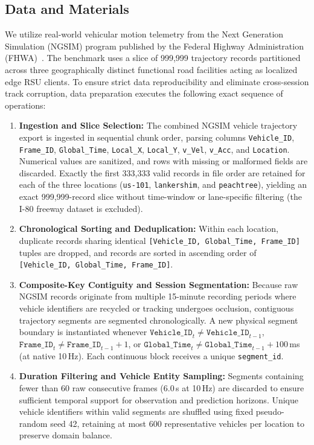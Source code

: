 \documentclass[journal]{IEEEtran}
\begin{document}
\subsection{Data and Materials}
\label{sec:data_materials}
We utilize real-world vehicular motion telemetry from the Next Generation Simulation (NGSIM) program published by the Federal Highway Administration (FHWA)~\cite{fhwa2006ngsim}. The benchmark uses a slice of 999,999 trajectory records partitioned across three geographically distinct functional road facilities acting as localized edge RSU clients. To ensure strict data reproducibility and eliminate cross-session track corruption, data preparation executes the following exact sequence of operations:
\begin{enumerate}
    \item \textbf{Ingestion and Slice Selection:} The combined NGSIM vehicle trajectory export is ingested in sequential chunk order, parsing columns \texttt{Vehicle\_ID}, \texttt{Frame\_ID}, \texttt{Global\_Time}, \texttt{Local\_X}, \texttt{Local\_Y}, \texttt{v\_Vel}, \texttt{v\_Acc}, and \texttt{Location}. Numerical values are sanitized, and rows with missing or malformed fields are discarded. Exactly the first 333,333 valid records in file order are retained for each of the three locations (\texttt{us-101}, \texttt{lankershim}, and \texttt{peachtree}), yielding an exact 999,999-record slice without time-window or lane-specific filtering (the I-80 freeway dataset is excluded).
    \item \textbf{Chronological Sorting and Deduplication:} Within each location, duplicate records sharing identical \texttt{[Vehicle\_ID, Global\_Time, Frame\_ID]} tuples are dropped, and records are sorted in ascending order of \texttt{[Vehicle\_ID, Global\_Time, Frame\_ID]}.
    \item \textbf{Composite-Key Contiguity and Session Segmentation:} Because raw NGSIM records originate from multiple 15-minute recording periods where vehicle identifiers are recycled or tracking undergoes occlusion, contiguous trajectory segments are segmented chronologically. A new physical segment boundary is instantiated whenever $\texttt{Vehicle\_ID}_t \ne \texttt{Vehicle\_ID}_{t-1}$, $\texttt{Frame\_ID}_t \ne \texttt{Frame\_ID}_{t-1} + 1$, or $\texttt{Global\_Time}_t \ne \texttt{Global\_Time}_{t-1} + 100$\,ms (at native 10\,Hz). Each continuous block receives a unique \texttt{segment\_id}.
    \item \textbf{Duration Filtering and Vehicle Entity Sampling:} Segments containing fewer than 60 raw consecutive frames (6.0\,s at 10\,Hz) are discarded to ensure sufficient temporal support for observation and prediction horizons. Unique vehicle identifiers within valid segments are shuffled using fixed pseudo-random seed 42, retaining at most 600 representative vehicles per location to preserve domain balance.

\end{enumerate}
\end{document}
